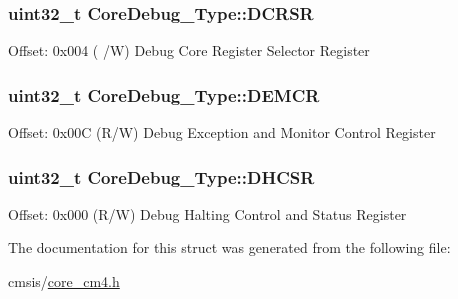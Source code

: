 \subsubsection[{\texorpdfstring{D\+C\+R\+SR}{DCRSR}}]{ uint32\+\_\+t Core\+Debug\+\_\+\+Type\+::\+D\+C\+R\+SR}\hypertarget{struct_core_debug___type_afefa84bce7497652353a1b76d405d983}{}\label{struct_core_debug___type_afefa84bce7497652353a1b76d405d983}
Offset\+: 0x004 ( /W) Debug Core Register Selector Register 
\subsubsection[{\texorpdfstring{D\+E\+M\+CR}{DEMCR}}]{ uint32\+\_\+t Core\+Debug\+\_\+\+Type\+::\+D\+E\+M\+CR}\hypertarget{struct_core_debug___type_a5cdd51dbe3ebb7041880714430edd52d}{}\label{struct_core_debug___type_a5cdd51dbe3ebb7041880714430edd52d}
Offset\+: 0x00C (R/W) Debug Exception and Monitor Control Register 
\subsubsection[{\texorpdfstring{D\+H\+C\+SR}{DHCSR}}]{ uint32\+\_\+t Core\+Debug\+\_\+\+Type\+::\+D\+H\+C\+SR}\hypertarget{struct_core_debug___type_a25c14c022c73a725a1736e903431095d}{}\label{struct_core_debug___type_a25c14c022c73a725a1736e903431095d}
Offset\+: 0x000 (R/W) Debug Halting Control and Status Register 

The documentation for this struct was generated from the following file\+:\begin{DoxyCompactItemize}
\item 
cmsis/\hyperlink{core__cm4_8h}{core\+\_\+cm4.\+h}\end{DoxyCompactItemize}
